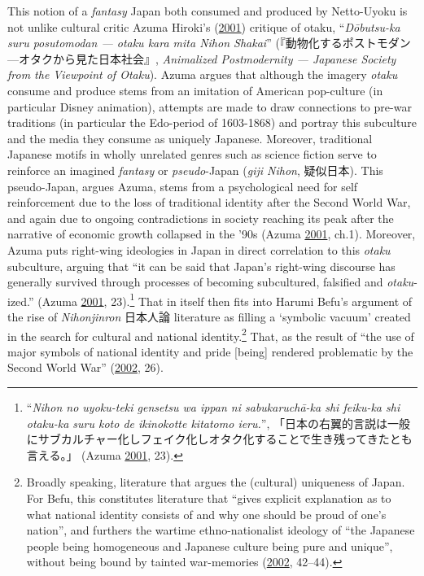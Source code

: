 \documentclass[10pt,british,A4paper,twoside]{memoir}
\begin{document}
This notion of a \emph{fantasy} Japan both consumed and produced by
Netto-Uyoku is not unlike cultural critic Azuma Hiroki's
(\protect\hyperlink{ref-azuma_otaku:_2001}{2001}) critique of otaku,
``\emph{Dōbutsu-ka suru posutomodan --- otaku kara mita Nihon Shakai}''
(『動物化するポストモダン---オタクから見た日本社会』, \emph{Animalized
Postmodernity --- Japanese Society from the Viewpoint of Otaku}). Azuma
argues that although the imagery \emph{otaku} consume and produce stems
from an imitation of American pop-culture (in particular Disney
animation), attempts are made to draw connections to pre-war traditions
(in particular the Edo-period of 1603-1868) and portray this subculture
and the media they consume as uniquely Japanese. Moreover, traditional
Japanese motifs in wholly unrelated genres such as science fiction serve
to reinforce an imagined \emph{fantasy} or \emph{pseudo}-Japan
(\emph{giji Nihon}, 疑似日本). This pseudo-Japan, argues Azuma, stems from a psychological need for
self reinforcement due to the loss of traditional identity after the
Second World War, and again due to ongoing contradictions in society
reaching its peak after the narrative of economic growth collapsed in
the '90s (Azuma \protect\hyperlink{ref-azuma_otaku:_2001}{2001}, ch.1).
Moreover, Azuma puts right-wing ideologies in Japan in direct
correlation to this \emph{otaku} subculture, arguing that ``it can be
said that Japan's right-wing discourse has generally survived through
processes of becoming subcultured, falsified and \emph{otaku}-ized.''
(Azuma \protect\hyperlink{ref-azuma_otaku:_2001}{2001}, 23).\footnote{``\emph{Nihon
  no uyoku-teki gensetsu wa ippan ni sabukaruchā-ka shi feiku-ka shi
  otaku-ka suru koto de ikinokotte kitatomo ieru.}'',
  「日本の右翼的言説は一般にサブカルチャー化しフェイク化しオタク化することで生き残ってきたとも言える。」
  (Azuma \protect\hyperlink{ref-azuma_otaku:_2001}{2001}, 23).} That in itself
then fits into Harumi Befu's argument of the rise of \emph{Nihonjinron}
日本人論 literature as filling a `symbolic vacuum' created in the search
for cultural and national identity.\footnote{Broadly speaking,
  literature that argues the (cultural) uniqueness of Japan. For Befu,
  this constitutes literature that ``gives explicit explanation as to
  what national identity consists of and why one should be proud of
  one's nation'', and furthers the wartime ethno-nationalist ideology of
  ``the Japanese people being homogeneous and Japanese culture being
  pure and unique'', without being bound by tainted war-memories
  (\protect\hyperlink{ref-befu_symbols_2002}{2002}, 42--44).} That, as
the result of ``the use of major symbols of national identity and pride
{[}being{]} rendered problematic by the Second World War''
(\protect\hyperlink{ref-befu_symbols_2002}{2002}, 26).
\end{document}
